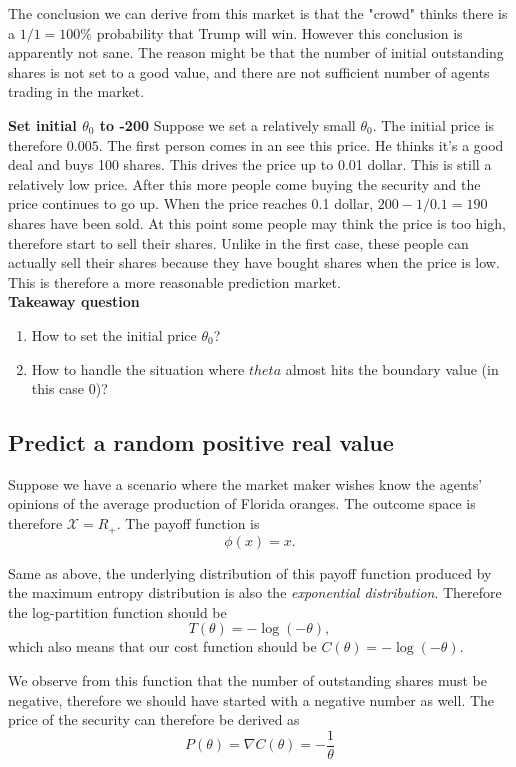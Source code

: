 \documentclass{article}
\begin{document}
The conclusion we can derive from this market is that the "crowd" thinks there is a $1/1=100\%$ probability that Trump will win. However this conclusion is apparently not sane. The reason might be that the number of initial outstanding shares is not set to a good value, and there are not sufficient number of agents trading in the market.

\textbf{Set initial $\theta_0$ to -200}
Suppose we set a relatively small $\theta_0$. The initial price is therefore $0.005$. The first person comes in an see this price. He thinks it's a good deal and buys 100 shares. This drives the price up to 0.01 dollar. This is still a relatively low price. After this more people come buying the security and the price continues to go up. When the price reaches 0.1 dollar, $200-1/0.1=190$ shares have been sold. At this point some people may think the price is too high, therefore start to sell their shares. Unlike in the first case, these people can actually sell their shares because they have bought shares when the price is low. This is therefore a more reasonable prediction market.\\

\textbf{Takeaway question}
\begin{enumerate}
    \item How to set the initial price $\theta_0$?
    \item How to handle the situation where $theta$ almost hits the boundary value (in this case 0)?
\end{enumerate}
\subsection{Predict a random positive real value}
Suppose we have a scenario where the market maker wishes know the agents' opinions of the average production of Florida oranges. The outcome space is therefore $\mathcal{X}=R_+$. The payoff function is $$\phi(x)=x.$$

Same as above, the underlying distribution of this payoff function produced by the maximum entropy distribution is also the \textit{exponential distribution}. Therefore the log-partition function should be
$$T(\theta)=-\log(-\theta),$$ which also means that our cost function should be $C(\theta)=-\log(-\theta).$

We observe from this function that the number of outstanding shares must be negative, therefore we should have started with a negative number as well. The price of the security can therefore be derived as
\begin{displaymath}
P(\theta)=\nabla C(\theta)=-\frac{1}{\theta}
\end{displaymath}
\end{document}
